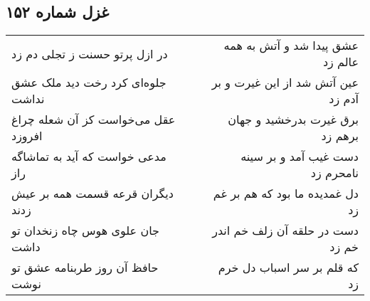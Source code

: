 \begin{center}
\section*{غزل شماره ۱۵۲}
\label{sec:sh152}
\begin{longtable}{l p{0.5cm} r}
در ازل پرتو حسنت ز تجلی دم زد
&&
عشق پیدا شد و آتش به همه عالم زد
\\
جلوه‌ای کرد رخت دید ملک عشق نداشت
&&
عین آتش شد از این غیرت و بر آدم زد
\\
عقل می‌خواست کز آن شعله چراغ افروزد
&&
برق غیرت بدرخشید و جهان برهم زد
\\
مدعی خواست که آید به تماشاگه راز
&&
دست غیب آمد و بر سینه نامحرم زد
\\
دیگران قرعه قسمت همه بر عیش زدند
&&
دل غمدیده ما بود که هم بر غم زد
\\
جان علوی هوس چاه زنخدان تو داشت
&&
دست در حلقه آن زلف خم اندر خم زد
\\
حافظ آن روز طربنامه عشق تو نوشت
&&
که قلم بر سر اسباب دل خرم زد
\\
\end{longtable}
\end{center}
